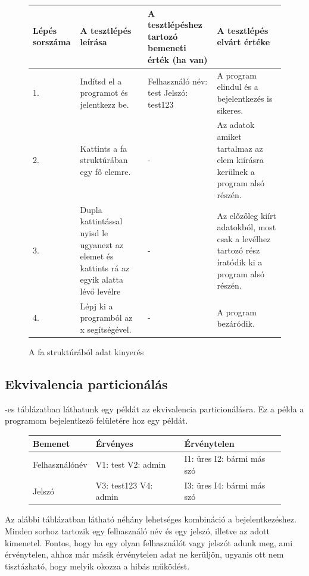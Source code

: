 \begin{figure} [h]
	\begin{center}
		\resizebox{\textwidth}{!} {
			\begin{tabular}{ |p{3cm}|p{5cm}|p{5cm}|p{5cm}| } 
				\hline
				Lépés sorszáma & A tesztlépés leírása & A tesztlépéshez tartozó bemeneti érték (ha van) & A tesztlépés elvárt értéke  \\ 
				\hline
				1. & Indítsd el a programot és jelentkezz be. & Felhasználó név: test \newline Jelszó: test123 & A program elindul és a bejelentkezés is sikeres.  \\ 
				\hline
				2. & Kattints a fa struktúrában egy fő elemre. & - & Az adatok amiket tartalmaz az elem kiírásra kerülnek a program alsó részén.\\ 
				\hline
				3. & Dupla kattintással nyisd le ugyanezt az elemet és kattints rá az egyik alatta lévő levélre & - & Az előzőleg kiírt adatokból, most csak a levélhez tartozó rész íratódik ki a program alsó részén. \\
				\hline
				4. & Lépj ki a programból az x segítségével. & - & A program bezáródik. \\
				\hline
			\end{tabular}
		}
	\end{center}
	\caption{A fa struktúrából adat kinyerés}
	\label{fig:jtree}
\end{figure}

\subsection{Ekvivalencia particionálás} -es táblázatban láthatunk egy példát az ekvivalencia particionálásra. Ez a példa a programom bejelentkező felületére hoz egy példát.

\begin{figure} [h]
	\begin{center}
		\begin{tabular}{ | p{4cm} | p{4cm}|  p{4cm} |} 
			\hline
			Bemenet & Érvényes & Érvénytelen  \\ 
			\hline
			Felhasználónév & V1: test \newline V2: admin & I1: üres \newline I2: bármi más szó  \\ 
			\hline
			Jelszó & V3: test123 \newline V4: admin & I3: üres \newline I4: bármi más szó  \\ 
			\hline
		\end{tabular}
	\end{center}
	\label{fig:ekvivalencia}
\end{figure}
\newpage
Az alábbi táblázatban látható néhány lehetséges kombináció a bejelentkezéshez. Minden sorhoz tartozik egy felhasználó név és egy jelszó, illetve az adott kimenetel. Fontos, hogy ha egy olyan felhasználót vagy jelszót adunk meg, ami érvénytelen, ahhoz már másik érvénytelen adat ne kerüljön, ugyanis ott nem tisztázható, hogy melyik okozza a hibás működést.

